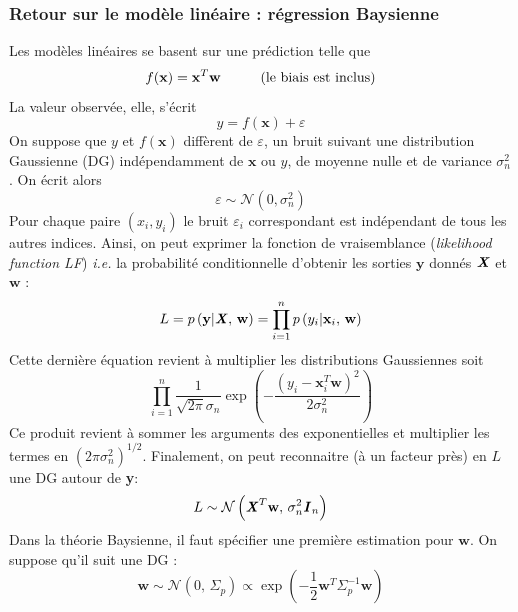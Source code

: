 \documentclass[a4paper,12pt]{report}
\newcommand{\bepar}[1]{
	\left( #1 \right)  
}
\numberwithin{equation}{section} %
\begin{document}
\subsubsection*{Retour sur le modèle linéaire : régression Baysienne}
\noindent Les modèles linéaires se basent sur une prédiction telle que
\begin{equation}
f(\textbf{x}) = \textbf{x}^T\textbf{w} \text{\hspace{1cm}(le biais est inclus)}
\end{equation}
La valeur observée, elle, s'écrit 
\begin{equation}
y = f(\textbf{x}) + \varepsilon \label{y_et_f}
\end{equation}
On suppose que $y$ et $f(\textbf{x})$ diffèrent de $\varepsilon$, un bruit suivant une distribution Gaussienne (DG) indépendamment de $\textbf{x}$ ou $y$, de moyenne nulle et de variance $\sigma^2_n$. On écrit alors 
\begin{equation}
\varepsilon \sim \mathcal{N}\bepar{0, \sigma^2_n}
\end{equation}
Pour chaque paire $\bepar{x_i, y_i}$ le bruit $\varepsilon_i$ correspondant est indépendant de tous les autres indices. Ainsi, on peut exprimer la fonction de vraisemblance (\textit{likelihood function LF}) \textit{i.e.} la probabilité conditionnelle d'obtenir les sorties $\textbf{y}$ donnés $\textbf{\textit{X}}$ et $\textbf{w}$ :
\begin{equation}
L = p\bepar{\textbf{y} | \textbf{\textit{X}},\, \textbf{w}} =  \prod_{i=1}^{n} p\bepar{y_i | \textbf{x}_i, \, \textbf{w} }
\end{equation}
Cette dernière équation revient à multiplier les distributions Gaussiennes soit
\begin{equation}
\prod_{i=1}^n\frac{1}{\sqrt{2 \pi} \sigma_n} \exp{\bepar{- \frac{\bepar{y_i - \textbf{x}_i^T \textbf{w}}^2}{2 \sigma_n^2}}} 
\end{equation}
Ce produit revient à sommer les arguments des exponentielles et multiplier les termes en $\bepar{2\pi\sigma_n^2}^{1/2}$. Finalement, on peut reconnaitre (à un facteur près) en $L$ une DG autour de \textbf{y}:
\begin{equation}
L \sim \mathcal{N}\bepar{\textbf{\textit{X}}^T\textbf{w}, \, \sigma^2_n \textbf{\textit{I}}_n} \label{likely}
\end{equation}
Dans la théorie Baysienne, il faut spécifier une première estimation pour $\textbf{w}$. On suppose qu'il suit une DG : \begin{equation}
\textbf{w} \sim \mathcal{N}\bepar{0,\, \Sigma_p} \propto \exp{\bepar{-\frac{1}{2} \textbf{w}^T \Sigma^{-1}_p\textbf{w}}}
\end{equation}\\
\end{document}
